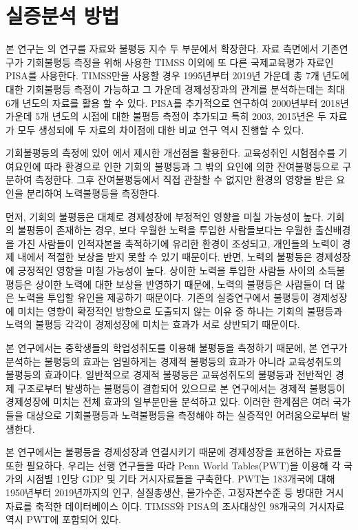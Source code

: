 \section{실증분석 방법}

본 연구는 \citet{kno17}의 연구를 자료와 불평등 지수 두 부분에서 확장한다.
자료 측면에서 기존연구가 기회불평등 측정을 위해 사용한 TIMSS 이외에 또 다른 국제교육평가 자료인 PISA를 사용한다. TIMSS만을 사용할 경우 1995년부터 2019년 가운데 총 7개 년도에 대한 기회불평등 측정이 가능하고 그 가운데 경제성장과의 관계를 분석하는데는 최대 6개 년도의 자료를 활용 할 수 있다. PISA를 추가적으로 연구하여 2000년부터 2018년 가운데 5개 년도의 시점에 대한 불평등 측정이 추가되고 특히 2003, 2015년은 두 자료가 모두 생성되에 두 자료의 차이점에 대한 비교 연구 역시 진행할 수 있다.

기회불평등의 측정에 있어 \citet{betl12}에서 제시한 개선점을 활용한다.
교육성취인 시험점수를 기여요인에 따라 환경으로 인한 기회의 불평등과 그 밖의 요인에 의한 잔여불평등으로 구분하여 측정한다.
그후 잔여불평등에서 직접 관찰할 수 없지만 환경의 영향을 받은 요인을 분리하여 노력불평등을 측정한다.

먼저, 기회의 불평등은 대체로 경제성장에 부정적인 영향을 미칠 가능성이 높다.
기회의 불평등이 존재하는 경우, 보다 우월한 노력을 투입한 사람들보다는 우월한 출신배경을 가진 사람들이 인적자본을 축적하기에 유리한 환경이 조성되고, 개인들의 노력이 경제 내에서 적절한 보상을 받지 못할 수 있기 때문이다.
반면, 노력의 불평등은 경제성장에 긍정적인 영향을 미칠 가능성이 높다.
상이한 노력을 투입한 사람들 사이의 소득불평등은 상이한 노력에 대한 보상을 반영하기 때문에, 노력의 불평등은 사람들이 더 많은 노력을 투입할 유인을 제공하기 때문이다.
기존의 실증연구에서 불평등이 경제성장에 미치는 영향이 확정적인 방향으로 도출되지 않는 이유 중 하나는 기회의 불평등과 노력의 불평등 각각이 경제성장에 미치는 효과가 서로 상반되기 때문이다.

본 연구에서는 중학생들의 학업성취도를 이용해 불평등을 측정하기 때문에, 본 연구가 분석하는 불평등의 효과는 엄밀하게는 경제적 불평등의 효과가 아니라 교육성취도의 불평등의 효과이다.
일반적으로 경제적 불평등은 교육성취도의 불평등과 전반적인 경제 구조로부터 발생하는 불평등이 결합되어 있으므로 본 연구에서는 경제적 불평등이 경제성장에 미치는 전체 효과의 일부분만을 분석하고 있다.
이러한 한계점은 여러 국가들을 대상으로 기회불평등과 노력불평등을 측정해야 하는 실증적인 어려움으로부터 발생한다.

본 연구에서는 불평등을 경제성장과 연결시키기 때문에 경제성장을 표현하는 자료들 또한 필요하다.
우리는 선행 연구들을 따라 Penn World Tables(PWT)을 이용해 각 국가의 시점별 1인당 GDP 및 기타 거시자료들을 구축한다.
PWT는 183개국에 대해 1950년부터 2019년까지의 인구, 실질총생산, 물가수준, 고정자본수준 등 방대한 거시자료를 축적한 데이터베이스 이다.
TIMSS와 PISA의 조사대상인 98개국의 거시자료 역시 PWT에 포함되어 있다.

